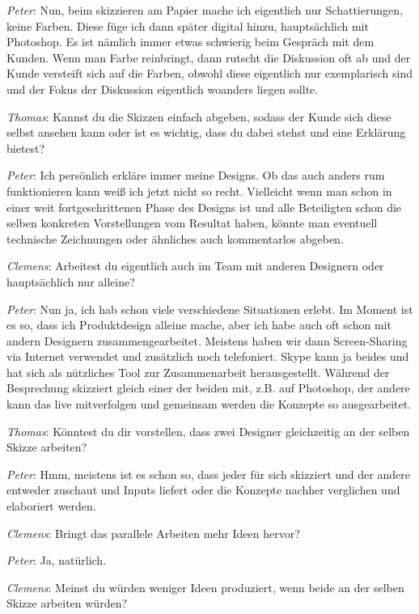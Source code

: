 \medskip \emph{Peter}: Nun, beim skizzieren am Papier mache ich eigentlich nur Schattierungen, keine Farben. Diese füge ich dann später digital hinzu, hauptsächlich mit Photoshop. Es ist nämlich immer etwas schwierig beim Gespräch mit dem Kunden. Wenn man Farbe reinbringt, dann rutscht die Diskussion oft ab und der Kunde versteift sich auf die Farben, obwohl diese eigentlich nur exemplarisch sind und der Fokus der Diskussion eigentlich woanders liegen sollte.

\medskip \emph{Thomas}: Kannst du die Skizzen einfach abgeben, sodass der Kunde sich diese selbst ansehen kann oder ist es wichtig, dass du dabei stehst und eine Erklärung bietest?

\medskip \emph{Peter}: Ich persönlich erkläre immer meine Designs. Ob das auch anders rum funktionieren kann weiß ich jetzt nicht so recht. Vielleicht wenn man schon in einer weit fortgeschrittenen Phase des Designs ist und alle Beteiligten schon die selben konkreten Vorstellungen vom Resultat haben, könnte man eventuell technische Zeichnungen oder ähnliches auch kommentarlos abgeben.

\medskip \emph{Clemens}: Arbeitest du eigentlich auch im Team mit anderen Designern oder hauptsächlich nur alleine?

\medskip \emph{Peter}: Nun ja, ich hab schon viele verschiedene Situationen erlebt. Im Moment ist es so, dass ich Produktdesign alleine mache, aber ich habe auch oft schon mit andern Designern zusammengearbeitet. Meistens haben wir dann Screen-Sharing via Internet verwendet und zusätzlich noch telefoniert. Skype kann ja beides und hat sich als nützliches Tool zur Zusammenarbeit herausgestellt. Während der Besprechung skizziert gleich einer der beiden mit, z.B. auf Photoshop, der andere kann das live mitverfolgen und gemeinsam werden die Konzepte so ausgearbeitet. 

\medskip \emph{Thomas}: Könntest du dir vorstellen, dass zwei Designer gleichzeitig an der selben Skizze arbeiten?

\medskip \emph{Peter}: Hmm, meistens ist es schon so, dass jeder für sich skizziert und der andere entweder zuschaut und Inputs liefert oder die Konzepte nachher verglichen und elaboriert werden.

\medskip \emph{Clemens}: Bringt das parallele Arbeiten mehr Ideen hervor?

\medskip \emph{Peter}: Ja, natürlich.

\medskip \emph{Clemens}: Meinst du würden weniger Ideen produziert, wenn beide an der selben Skizze arbeiten würden?


